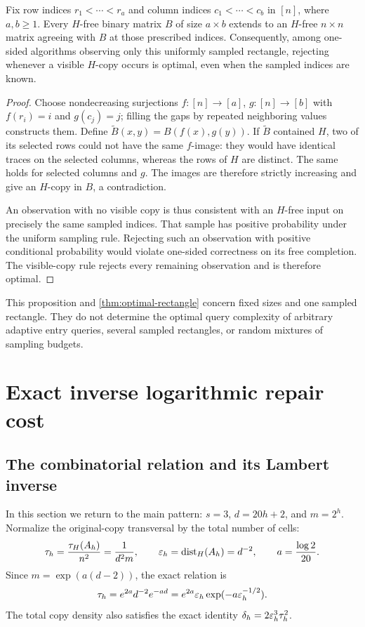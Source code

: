 \begin{proposition}
\label{prop:completion}
Fix row indices \(r_1<\cdots<r_a\) and column indices
\(c_1<\cdots<c_b\) in \([n]\), where \(a,b\ge1\). Every
\(H\)-free binary matrix \(B\) of size \(a\times b\) extends to
an \(H\)-free \(n\times n\) matrix agreeing with \(B\) at those
prescribed indices. Consequently, among one-sided algorithms observing
only this uniformly sampled rectangle, rejecting whenever a visible
\(H\)-copy occurs is optimal, even when the sampled indices are known.
\end{proposition}
\begin{proof}
Choose nondecreasing surjections \(f:[n]\to[a]\), \(g:[n]\to[b]\)
with \(f(r_i)=i\) and \(g(c_j)=j\); filling the gaps by repeated
neighboring values constructs them. Define
\(\widetilde B(x,y)=B(f(x),g(y))\).
If \(\widetilde B\) contained \(H\), two of its selected rows could
not have the same \(f\)-image: they would have identical traces on
the selected columns, whereas the rows of \(H\) are distinct.
The same holds for selected columns and \(g\). The images are
therefore strictly increasing and give an \(H\)-copy in \(B\), a
contradiction.

An observation with no visible copy is thus consistent with an
\(H\)-free input on precisely the same sampled indices. That sample
has positive probability under the uniform sampling rule. Rejecting
such an observation with positive conditional probability would
violate one-sided correctness on its free completion. The visible-copy
rule rejects every remaining observation and is therefore optimal.
\end{proof}

This proposition and \cref{thm:optimal-rectangle} concern fixed sizes
and one sampled rectangle. They do not determine the optimal query
complexity of arbitrary adaptive entry queries, several sampled
rectangles, or random mixtures of sampling budgets.

\section{Exact inverse logarithmic repair cost}
\label{sec:inversion}

\subsection{The combinatorial relation and its Lambert inverse}

In this section we return to the main pattern: \(s=3\),
\(d=20h+2\), and \(m=2^h\).
Normalize the original-copy transversal by the total number of cells:
\begin{equation}
 \tau_h=\frac{\tau_H(A_h)}{n^2}=\frac{1}{d^2m},\qquad
 \varepsilon_h=\operatorname{dist}_H(A_h)=d^{-2},\qquad a=\frac{\log2}{20}.
 \label{eq:tau-definition}
\end{equation}
Since \(m=\exp(a(d-2))\), the exact relation is
\begin{equation}
 \tau_h=e^{2a}d^{-2}e^{-ad}
       =e^{2a}\varepsilon_h\exp(-a\varepsilon_h^{-1/2}).
 \label{eq:tau-epsilon}
\end{equation}
The total copy density also satisfies the exact identity
\(\delta_h=2\varepsilon_h^3\tau_h^2\).


